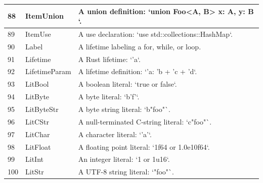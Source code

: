 \begin{longtable}{| p{} | p{} | p{} |}
88    & ItemUnion                      & A union definition: `union Foo<A, B> { x: A, y: B }`.                                                          \\ \hline
89    & ItemUse                        & A use declaration: `use std::collections::HashMap`.                                                            \\ \hline
90    & Label                          & A lifetime labeling a for, while, or loop.                                                                     \\ \hline
91    & Lifetime                       & A Rust lifetime: `'a`.                                                                                         \\ \hline
92    & LifetimeParam                  & A lifetime definition: `'a: 'b + 'c + 'd`.                                                                     \\ \hline
93    & LitBool                        & A boolean literal: `true or false`.                                                                            \\ \hline
94    & LitByte                        & A byte literal: `b'f'`.                                                                                        \\ \hline
95    & LitByteStr                     & A byte string literal: `b"foo"`.                                                                               \\ \hline
96    & LitCStr                        & A null-terminated C-string literal: `c"foo"`.                                                                  \\ \hline
97    & LitChar                        & A character literal: `'a'`.                                                                                    \\ \hline
98    & LitFloat                       & A floating point literal: `1f64 or 1.0e10f64`.                                                                 \\ \hline
99    & LitInt                         & An integer literal: `1 or 1u16`.                                                                               \\ \hline
100   & LitStr                         & A UTF-8 string literal: `"foo"`.                                                                               \\ \hline

\end{longtable}
